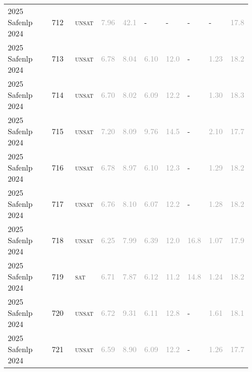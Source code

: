 \begin{center}
{\begin{longtable}{@{}llllllllll@{}}
2025 Safenlp 2024 & 712 & ~\textsc{unsat} & \textcolor{darkgray}{7.96} & \textcolor{darkgray}{42.1} & - & - & - & - & \textcolor{darkgray}{17.8} \\
2025 Safenlp 2024 & 713 & ~\textsc{unsat} & \textcolor{darkgray}{6.78} & \textcolor{darkgray}{8.04} & \textcolor{darkgray}{6.10} & \textcolor{darkgray}{12.0} & - & \textcolor{darkgray}{1.23} & \textcolor{darkgray}{18.2} \\
2025 Safenlp 2024 & 714 & ~\textsc{unsat} & \textcolor{darkgray}{6.70} & \textcolor{darkgray}{8.02} & \textcolor{darkgray}{6.09} & \textcolor{darkgray}{12.2} & - & \textcolor{darkgray}{1.30} & \textcolor{darkgray}{18.3} \\
2025 Safenlp 2024 & 715 & ~\textsc{unsat} & \textcolor{darkgray}{7.20} & \textcolor{darkgray}{8.09} & \textcolor{darkgray}{9.76} & \textcolor{darkgray}{14.5} & - & \textcolor{darkgray}{2.10} & \textcolor{darkgray}{17.7} \\
2025 Safenlp 2024 & 716 & ~\textsc{unsat} & \textcolor{darkgray}{6.78} & \textcolor{darkgray}{8.97} & \textcolor{darkgray}{6.10} & \textcolor{darkgray}{12.3} & - & \textcolor{darkgray}{1.29} & \textcolor{darkgray}{18.2} \\
2025 Safenlp 2024 & 717 & ~\textsc{unsat} & \textcolor{darkgray}{6.76} & \textcolor{darkgray}{8.10} & \textcolor{darkgray}{6.07} & \textcolor{darkgray}{12.2} & - & \textcolor{darkgray}{1.28} & \textcolor{darkgray}{18.2} \\
2025 Safenlp 2024 & 718 & ~\textsc{unsat} & \textcolor{darkgray}{6.25} & \textcolor{darkgray}{7.99} & \textcolor{darkgray}{6.39} & \textcolor{darkgray}{12.0} & \textcolor{darkgray}{16.8} & \textcolor{darkgray}{1.07} & \textcolor{darkgray}{17.9} \\
2025 Safenlp 2024 & 719 & ~\textsc{sat} & \textcolor{darkgray}{6.71} & \textcolor{darkgray}{7.87} & \textcolor{darkgray}{6.12} & \textcolor{darkgray}{11.2} & \textcolor{darkgray}{14.8} & \textcolor{darkgray}{1.24} & \textcolor{darkgray}{18.2} \\
2025 Safenlp 2024 & 720 & ~\textsc{unsat} & \textcolor{darkgray}{6.72} & \textcolor{darkgray}{9.31} & \textcolor{darkgray}{6.11} & \textcolor{darkgray}{12.8} & - & \textcolor{darkgray}{1.61} & \textcolor{darkgray}{18.1} \\
2025 Safenlp 2024 & 721 & ~\textsc{unsat} & \textcolor{darkgray}{6.59} & \textcolor{darkgray}{8.90} & \textcolor{darkgray}{6.09} & \textcolor{darkgray}{12.2} & - & \textcolor{darkgray}{1.26} & \textcolor{darkgray}{17.7} \\

\end{longtable}}
\end{center}
